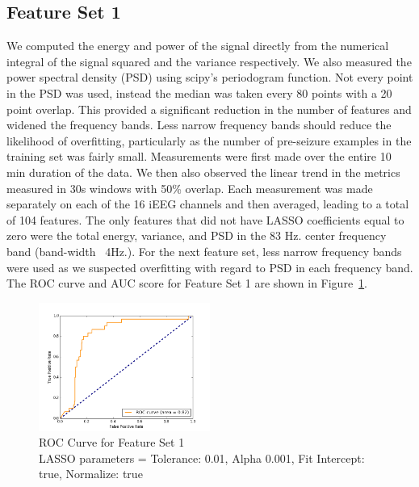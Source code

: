 \documentclass[10pt, conference, compsocconf]{IEEEtran}
\begin{document}
\subsection{Feature Set 1}
We computed the energy and power of the signal directly from the numerical
integral of the signal squared and the variance respectively. We also measured
the power spectral density (PSD) using scipy’s periodogram function. Not every
point in the PSD was used, instead the median was taken every 80 points with a
20 point overlap. This provided a significant reduction in the number of
features and widened the frequency bands. Less narrow frequency bands should
reduce the likelihood of overfitting, particularly as the number of pre-seizure
examples in the training set was fairly small. Measurements were first made over
the entire 10 min duration of the data. We then also observed the linear trend
in the metrics measured in 30s windows with 50\% overlap. Each measurement was
made separately on each of the 16 iEEG channels and then averaged, leading to a
total of 104 features. The only features that did not have LASSO coefficients
equal to zero were the total energy, variance, and PSD in the 83 Hz. center
frequency band (band-width ~4Hz.). For the next feature set, less narrow
frequency bands were used as we suspected overfitting with regard to PSD in each
frequency band. The ROC curve and AUC score for Feature Set 1 are shown in
Figure~\ref{fig:ROC1}.

\begin{figure}[t]
\centering
  \includegraphics[width=0.5\textwidth]{fig/image02.png}  
    \caption{ROC Curve for Feature Set 1\\LASSO parameters = Tolerance: 0.01, Alpha 0.001, Fit Intercept:
    true, Normalize: true}
   \label{fig:ROC1}
\end{figure}
\end{document}
